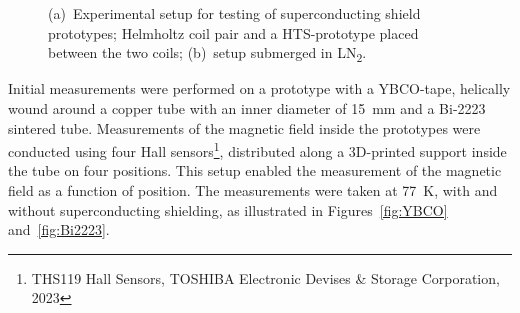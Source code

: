 \begin{refsection}
        \begin{figure}
            \centering
            \hfill
            \caption[muEDM: setup to test SC channels]{(a)~Experimental setup for testing of superconducting shield prototypes; Helmholtz coil pair and a HTS-prototype placed between the two coils; (b)~setup submerged in LN\textsubscript{2}.}
        \label{fig:Setup}
        \end{figure}

        \noindent
        Initial measurements were performed on a prototype with a YBCO-tape, helically wound around a copper tube with an inner diameter of \SI{15}{mm} and a Bi-2223 sintered tube. 
        Measurements of the magnetic field inside the prototypes were conducted using four Hall sensors\footnote{THS119 Hall Sensors, TOSHIBA Electronic Devises \& Storage Corporation, 2023}, distributed along a 3D-printed support inside the tube on four positions. 
        This setup enabled the measurement of the magnetic field as a function of position. 
        The measurements were taken at \SI{77}{K}, with and without superconducting shielding, as illustrated in Figures~\ref{fig:YBCO} and~\ref{fig:Bi2223}.


\end{refsection}
